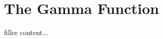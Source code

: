 \documentclass[../../templates/section]{subfiles}
\begin{document}
\section{The Gamma Function}\label{sec:the-gamma-function}

filler content...
\end{document}
